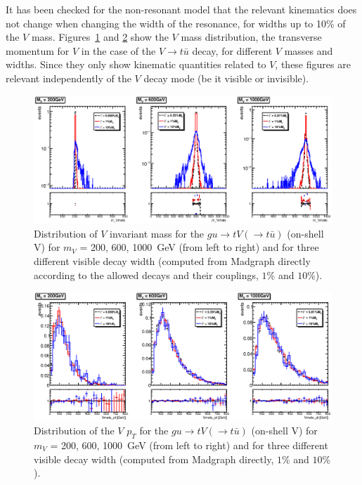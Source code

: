 It has been checked for the non-resonant model that the relevant kinematics 
does not change when changing 
the width of the resonance, for widths up to 10\% of the $V$ mass. 
Figures~\ref{fig:appB:Vmass} and \ref{fig:appB:pTV} show 
the $V$ mass distribution, the transverse momentum for $V$ 
in the case of the $V\to t\bar{u}$ decay, for different $V$ masses and widths.
Since they only show kinematic quantities related to $V$, these figures are relevant independently of the $V$ decay mode (be it visible or invisible). 
\begin{figure}[!h!tpd]
	\centering
	\includegraphics[width=1.0\textwidth]{figures/singletop/m_Vmets}
	\caption{
		Distribution of $V$ invariant mass for the $gu\to tV(\to t\bar{u})$ (on-shell V) 
		for $m_V$ = {200, 600, 1000}~GeV (from left to right) and for three different
		visible decay width (computed from Madgraph directly according to the allowed decays and their couplings, $1\%$ and $10\%$).
	}   
	\label{fig:appB:Vmass}
\end{figure}


\begin{figure}[!h!tpd]
	\centering
	\includegraphics[width=1.0\textwidth]{figures/singletop/Vmets_pt}
	\caption{
		Distribution of the $V$ $p_T$ for the $gu\to tV(\to t\bar{u})$ (on-shell V) for $m_V$ = {200, 600, 1000}~GeV (from left to right) and for three different
		visible decay width (computed from Madgraph directly, $1\%$ and $10\%$).
	}
	\label{fig:appB:pTV}
\end{figure}


